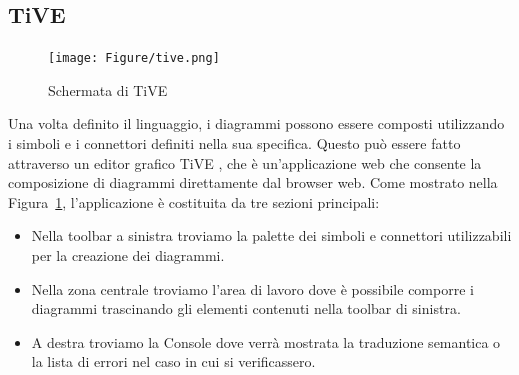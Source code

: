         \subsection{TiVE}

            \begin{figure}[htbp]
                \centering
                \texttt{[image: Figure/tive.png]}
                \caption{Schermata di TiVE}
                \label{fig:tive}
            \end{figure}

            Una volta definito il linguaggio, i diagrammi possono essere composti utilizzando i simboli e i connettori definiti nella sua specifica. Questo può essere fatto attraverso un editor grafico TiVE \cite{localcontext}, che è un'applicazione web che consente la composizione di diagrammi direttamente dal browser web.
            \newline
            Come mostrato nella Figura~\ref{fig:tive}, l'applicazione è costituita da tre sezioni principali:
            \begin{itemize}
                \item Nella toolbar a sinistra troviamo la palette dei simboli e connettori utilizzabili per la creazione dei diagrammi.
                \item Nella zona centrale troviamo l'area di lavoro dove è possibile comporre i diagrammi trascinando gli elementi contenuti nella toolbar di sinistra.
                \item A destra troviamo la Console dove verrà mostrata la traduzione semantica o la lista di errori nel caso in cui si verificassero.
            \end{itemize}

